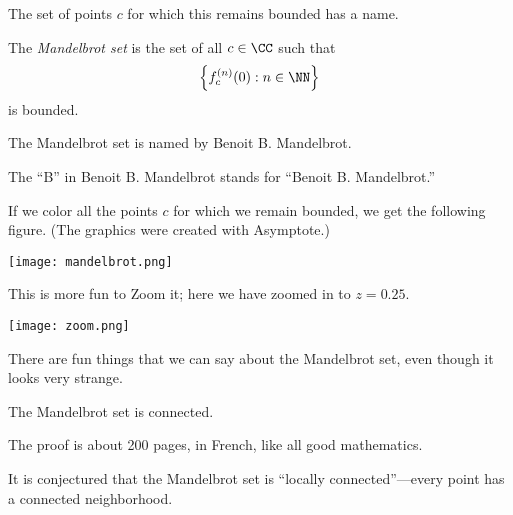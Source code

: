 The set of points $c$ for which this remains bounded has a name.
\begin{definition}
	The \textit{Mandelbrot set} is the set of all $c\in\CC$ such that
	\[\left\{f_c^{(n)}(0):n\in\NN\right\}\]
	is bounded.
\end{definition}
\begin{remark}
	The Mandelbrot set is named by Benoit B. Mandelbrot.
\end{remark}
\begin{remark}
	The ``B'' in Benoit B. Mandelbrot stands for ``Benoit B. Mandelbrot.''
\end{remark}
If we color all the points $c$ for which we remain bounded, we get the following figure. (The graphics were created with Asymptote.)
\begin{center}
	\texttt{[image: mandelbrot.png]}
\end{center}
This is more fun to Zoom it; here we have zoomed in to $z=0.25$.
\begin{center}
	\texttt{[image: zoom.png]}
\end{center}
There are fun things that we can say about the Mandelbrot set, even though it looks very strange.
\begin{theorem}
	The Mandelbrot set is connected.
\end{theorem}
The proof is about 200 pages, in French, like all good mathematics.
\begin{remark}
	It is conjectured that the Mandelbrot set is ``locally connected''---every point has a connected neighborhood.
\end{remark}

